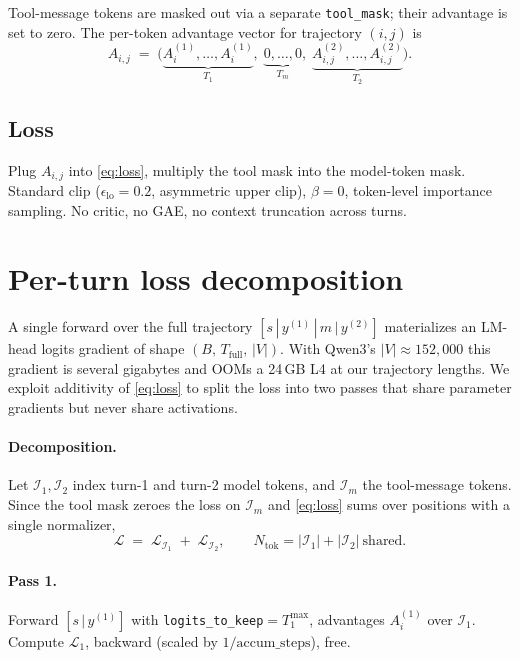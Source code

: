 \documentclass[11pt,a4paper]{article}
\begin{document}
Tool-message tokens are masked out via a separate \texttt{tool\_mask};
their advantage is set to zero. The per-token advantage vector for
trajectory $(i,j)$ is
\begin{equation}
  A_{i,j} \;=\; \big(\underbrace{A^{(1)}_{i},\dots,A^{(1)}_{i}}_{T_1},\;
                     \underbrace{0,\dots,0}_{T_m},\;
                     \underbrace{A^{(2)}_{i,j},\dots,A^{(2)}_{i,j}}_{T_2}\big).
\end{equation}

\subsection{Loss}

Plug $A_{i,j}$ into \eqref{eq:loss}, multiply the tool mask into the
model-token mask. Standard clip ($\epsilon_{\text{lo}}=0.2$, asymmetric
upper clip), $\beta=0$, token-level importance sampling. No critic, no
GAE, no context truncation across turns.

\section{Per-turn loss decomposition}
\label{sec:two-pass}

A single forward over the full trajectory
$[s\,|\,y^{(1)}\,|\,m\,|\,y^{(2)}]$ materializes an LM-head logits
gradient of shape $(B,\,T_{\text{full}},\,|V|)$. With Qwen3's
$|V|\approx 152{,}000$ this gradient is several gigabytes and OOMs a
24\,GB L4 at our trajectory lengths. We exploit additivity of
\eqref{eq:loss} to split the loss into two passes that share parameter
gradients but never share activations.

\paragraph{Decomposition.}
Let $\mathcal{I}_1, \mathcal{I}_2$ index turn-1 and turn-2 model
tokens, and $\mathcal{I}_m$ the tool-message tokens. Since the tool
mask zeroes the loss on $\mathcal{I}_m$ and \eqref{eq:loss} sums over
positions with a single normalizer,
\begin{equation}
  \mathcal{L} \;=\;
    \mathcal{L}_{\mathcal{I}_1} \;+\;
    \mathcal{L}_{\mathcal{I}_2},\qquad
  N_{\text{tok}} = |\mathcal{I}_1| + |\mathcal{I}_2|\ \text{shared.}
\label{eq:additive}
\end{equation}

\paragraph{Pass 1.} Forward $[s\,|\,y^{(1)}]$ with
\texttt{logits\_to\_keep}$=T_1^{\max}$, advantages $A^{(1)}_i$ over
$\mathcal{I}_1$. Compute $\mathcal{L}_1$, backward (scaled by
$1/\text{accum\_steps}$), free.
\end{document}
